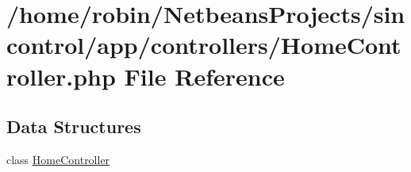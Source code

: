 \hypertarget{_home_controller_8php}{}\section{/home/robin/\+Netbeans\+Projects/sincontrol/app/controllers/\+Home\+Controller.php File Reference}
\label{_home_controller_8php}
\subsection*{Data Structures}
\begin{DoxyCompactItemize}
\item 
class \hyperlink{class_home_controller}{Home\+Controller}
\end{DoxyCompactItemize}
